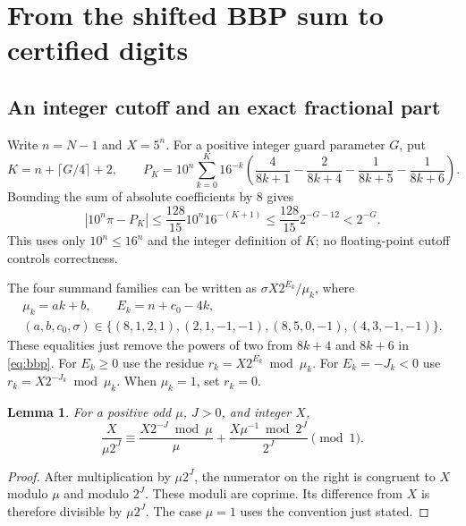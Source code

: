 \documentclass[11pt]{article}
\numberwithin{equation}{section}
\newtheorem{lemma}[theorem]{Lemma}
\theoremstyle{definition}
\begin{document}
\section{From the shifted BBP sum to certified digits}
\label{sec:decimal}

\subsection{An integer cutoff and an exact fractional part}

Write $n=N-1$ and $X=5^n$. For a positive integer guard
parameter $G$, put
\begin{equation}\label{eq:cutoff}
 K=n+\lceil G/4\rceil+2,\qquad
 P_K=10^n\sum_{k=0}^{K}16^{-k}
 \left(\frac4{8k+1}-\frac2{8k+4}
       -\frac1{8k+5}-\frac1{8k+6}\right).
\end{equation}
Bounding the sum of absolute coefficients by $8$ gives
\begin{equation}\label{eq:tail}
 |10^n\pi-P_K|
 \le\frac{128}{15}10^n16^{-(K+1)}
 \le\frac{128}{15}2^{-G-12}<2^{-G}.
\end{equation}
This uses only $10^n\le16^n$ and the integer definition
of $K$; no floating-point cutoff controls correctness.

The four summand families can be written as
$\sigma X2^{E_k}/\mu_k$, where
\begin{equation}\label{eq:families}
 \begin{gathered}
 \mu_k=ak+b,\qquad E_k=n+c_0-4k,\\
 (a,b,c_0,\sigma)\in
 \{(8,1,2,1),(2,1,-1,-1),
   (8,5,0,-1),(4,3,-1,-1)\}.
 \end{gathered}
\end{equation}
These equalities just remove the powers of two from
$8k+4$ and $8k+6$ in \eqref{eq:bbp}.
For $E_k\ge0$ use the residue
$r_k=X2^{E_k}\bmod\mu_k$.
For $E_k=-J_k<0$ use
$r_k=X2^{-J_k}\bmod\mu_k$.
When $\mu_k=1$, set $r_k=0$.

\begin{lemma}\label{lem:bezout}
For a positive odd $\mu$, $J>0$, and integer $X$,
\begin{equation}\label{eq:bezout}
 \frac{X}{\mu2^J}\equiv
 \frac{X2^{-J}\bmod\mu}{\mu}
 +\frac{X\mu^{-1}\bmod2^J}{2^J}\pmod1.
\end{equation}
\end{lemma}

\begin{proof}
After multiplication by $\mu2^J$, the numerator on the
right is congruent to $X$ modulo $\mu$ and modulo $2^J$.
These moduli are coprime. Its difference from $X$ is
therefore divisible by $\mu2^J$. The case $\mu=1$
uses the convention just stated.
\end{proof}
\end{document}
